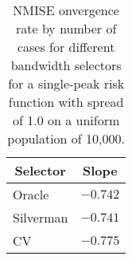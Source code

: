 \begin{table}[htbp]
\begin{center}
\begin{tabular}{lr}
\toprule
\multicolumn{1}{c}{Selector}&\multicolumn{1}{c}{Slope}\tabularnewline
\midrule
Oracle&$-0.742$\tabularnewline
Silverman&$-0.741$\tabularnewline
CV&$-0.775$\tabularnewline
\bottomrule
\end{tabular}
\caption[NMISE Convergence rate by number of cases for spread 1.0]{NMISE onvergence rate by number of cases for different bandwidth selectors for a single-peak risk function with spread of 1.0 on a uniform population of 10,000.\label{tab:results:nmise_convergence_by_num_cases}}\end{center}
\end{table}

